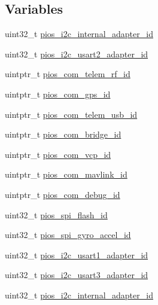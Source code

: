 \subsection*{\-Variables}
\begin{DoxyCompactItemize}
\item 
uint32\-\_\-t \hyperlink{group___quanton_ga55974b8a985ecdc9dfed8c0962c36dd8}{pios\-\_\-i2c\-\_\-internal\-\_\-adapter\-\_\-id}
\item 
uint32\-\_\-t \hyperlink{group___quanton_gac6281d2c740cad502557986139bfc291}{pios\-\_\-i2c\-\_\-usart2\-\_\-adapter\-\_\-id}
\item 
uintptr\-\_\-t \hyperlink{group___quanton_gae48e848f715b08971e23528feee79339}{pios\-\_\-com\-\_\-telem\-\_\-rf\-\_\-id}
\item 
uintptr\-\_\-t \hyperlink{group___quanton_ga05dca72c42c6c2b33fa62b8ee0fcb2ea}{pios\-\_\-com\-\_\-gps\-\_\-id}
\item 
uintptr\-\_\-t \hyperlink{group___quanton_ga513cc36d72b76de2fcb75ff233a79a4a}{pios\-\_\-com\-\_\-telem\-\_\-usb\-\_\-id}
\item 
uintptr\-\_\-t \hyperlink{group___quanton_gac040f05fa048688ee0269c2768698a14}{pios\-\_\-com\-\_\-bridge\-\_\-id}
\item 
uintptr\-\_\-t \hyperlink{group___quanton_gaaeb3e0d65ed5c6e7b921c54e1ad905db}{pios\-\_\-com\-\_\-vcp\-\_\-id}
\item 
uintptr\-\_\-t \hyperlink{group___quanton_gabdefeb92517c08b2db19b764db941de9}{pios\-\_\-com\-\_\-mavlink\-\_\-id}
\item 
uintptr\-\_\-t \hyperlink{group___quanton_ga14dc9e3d330b80a37a9699c2112358e0}{pios\-\_\-com\-\_\-debug\-\_\-id}
\item 
uint32\-\_\-t \hyperlink{group___quanton_gaebc54f2c5fc298fad979df4d9bd1414b}{pios\-\_\-spi\-\_\-flash\-\_\-id}
\item 
uint32\-\_\-t \hyperlink{group___quanton_ga865a74a9b199b06803aec5b185719d6d}{pios\-\_\-spi\-\_\-gyro\-\_\-accel\-\_\-id}
\item 
uint32\-\_\-t \hyperlink{group___quanton_ga29c6942e2bb055cc6d2a15ac205c540b}{pios\-\_\-i2c\-\_\-usart1\-\_\-adapter\-\_\-id}
\item 
uint32\-\_\-t \hyperlink{group___quanton_gacf440a27cf365a1dadff460dd8162422}{pios\-\_\-i2c\-\_\-usart3\-\_\-adapter\-\_\-id}
\item 
uint32\-\_\-t \hyperlink{group___quanton_ga55974b8a985ecdc9dfed8c0962c36dd8}{pios\-\_\-i2c\-\_\-internal\-\_\-adapter\-\_\-id}
\item 

\end{DoxyCompactItemize}
